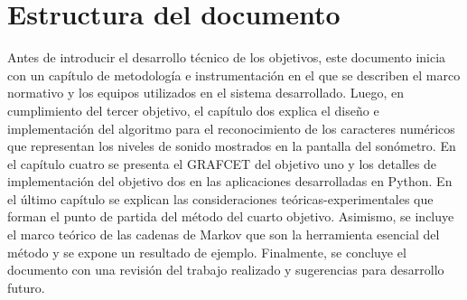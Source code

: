 \section{Estructura del documento}
Antes de introducir el desarrollo técnico de los objetivos, este documento inicia con un capítulo de metodología e
instrumentación en el que se describen el marco normativo y los equipos utilizados en el sistema desarrollado.
Luego, en cumplimiento del tercer objetivo, el capítulo dos explica el diseño e implementación del algoritmo
para el reconocimiento de los caracteres numéricos que representan los niveles de sonido mostrados en la pantalla del
sonómetro.
En el capítulo cuatro se presenta el GRAFCET del objetivo uno y los detalles de implementación del objetivo dos en las
aplicaciones desarrolladas en Python.
En el último capítulo se explican las consideraciones teóricas-experimentales que forman el punto de partida del método
del cuarto objetivo.
Asimismo, se incluye el marco teórico de las cadenas de Markov que son la herramienta esencial del
método y se expone un resultado de ejemplo.
Finalmente, se concluye el documento con una revisión del trabajo realizado y sugerencias para desarrollo futuro.